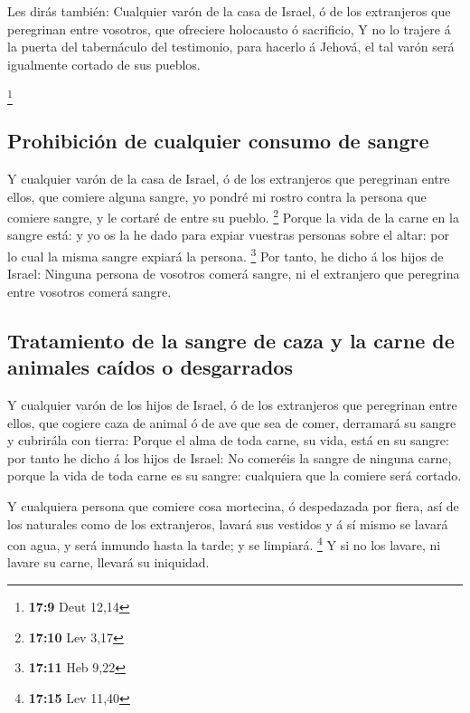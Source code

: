  Les dirás también: Cualquier varón de la casa de Israel, ó
de los extranjeros que peregrinan entre vosotros, que ofreciere
holocausto ó sacrificio,  Y no lo trajere á la puerta del
tabernáculo del testimonio, para hacerlo á Jehová, el tal varón será
igualmente cortado de sus pueblos.

\footnote{\textbf{17:9} Deut 12,14}

\hypertarget{prohibiciuxf3n-de-cualquier-consumo-de-sangre}{%
\subsection{Prohibición de cualquier consumo de
sangre}\label{prohibiciuxf3n-de-cualquier-consumo-de-sangre}}

 Y cualquier varón de la casa de Israel, ó de los
extranjeros que peregrinan entre ellos, que comiere alguna sangre, yo
pondré mi rostro contra la persona que comiere sangre, y le cortaré de
entre su pueblo. \footnote{\textbf{17:10} Lev 3,17}  Porque
la vida de la carne en la sangre está: y yo os la he dado para expiar
vuestras personas sobre el altar: por lo cual la misma sangre expiará la
persona. \footnote{\textbf{17:11} Heb 9,22}  Por tanto, he
dicho á los hijos de Israel: Ninguna persona de vosotros comerá sangre,
ni el extranjero que peregrina entre vosotros comerá sangre.

\hypertarget{tratamiento-de-la-sangre-de-caza-y-la-carne-de-animales-cauxeddos-o-desgarrados}{%
\subsection{Tratamiento de la sangre de caza y la carne de animales
caídos o
desgarrados}\label{tratamiento-de-la-sangre-de-caza-y-la-carne-de-animales-cauxeddos-o-desgarrados}}

 Y cualquier varón de los hijos de Israel, ó de los
extranjeros que peregrinan entre ellos, que cogiere caza de animal ó de
ave que sea de comer, derramará su sangre y cubrirála con tierra:
 Porque el alma de toda carne, su vida, está en su sangre:
por tanto he dicho á los hijos de Israel: No comeréis la sangre de
ninguna carne, porque la vida de toda carne es su sangre: cualquiera que
la comiere será cortado.

 Y cualquiera persona que comiere cosa mortecina, ó
despedazada por fiera, así de los naturales como de los extranjeros,
lavará sus vestidos y á sí mismo se lavará con agua, y será inmundo
hasta la tarde; y se limpiará. \footnote{\textbf{17:15} Lev 11,40}
 Y si no los lavare, ni lavare su carne, llevará su
iniquidad.

